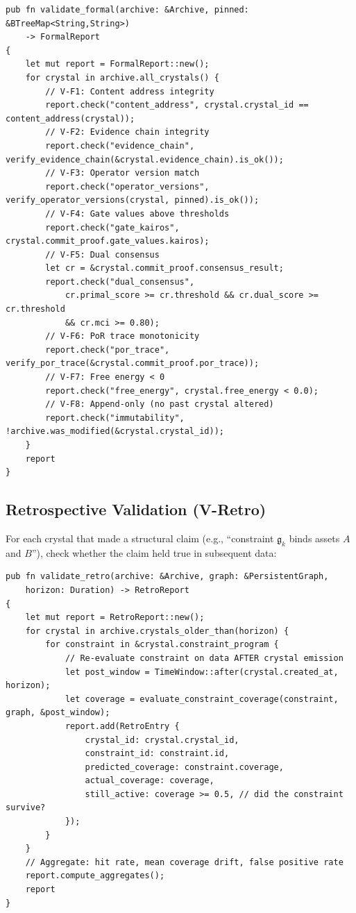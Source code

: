 \documentclass[10pt,a4paper]{article}
\begin{document}
\begin{lstlisting}[style=rust]
pub fn validate_formal(archive: &Archive, pinned: &BTreeMap<String,String>)
    -> FormalReport
{
    let mut report = FormalReport::new();
    for crystal in archive.all_crystals() {
        // V-F1: Content address integrity
        report.check("content_address", crystal.crystal_id == content_address(crystal));
        // V-F2: Evidence chain integrity
        report.check("evidence_chain", verify_evidence_chain(&crystal.evidence_chain).is_ok());
        // V-F3: Operator version match
        report.check("operator_versions", verify_operator_versions(crystal, pinned).is_ok());
        // V-F4: Gate values above thresholds
        report.check("gate_kairos", crystal.commit_proof.gate_values.kairos);
        // V-F5: Dual consensus
        let cr = &crystal.commit_proof.consensus_result;
        report.check("dual_consensus",
            cr.primal_score >= cr.threshold && cr.dual_score >= cr.threshold
            && cr.mci >= 0.80);
        // V-F6: PoR trace monotonicity
        report.check("por_trace", verify_por_trace(&crystal.commit_proof.por_trace));
        // V-F7: Free energy < 0
        report.check("free_energy", crystal.free_energy < 0.0);
        // V-F8: Append-only (no past crystal altered)
        report.check("immutability", !archive.was_modified(&crystal.crystal_id));
    }
    report
}
\end{lstlisting}

\subsection{Retrospective Validation (V-Retro)}

For each crystal that made a structural claim (e.g., ``constraint $\mathfrak{g}_k$ binds assets $A$ and $B$''), check whether the claim held true in subsequent data:

\begin{lstlisting}[style=rust]
pub fn validate_retro(archive: &Archive, graph: &PersistentGraph,
    horizon: Duration) -> RetroReport
{
    let mut report = RetroReport::new();
    for crystal in archive.crystals_older_than(horizon) {
        for constraint in &crystal.constraint_program {
            // Re-evaluate constraint on data AFTER crystal emission
            let post_window = TimeWindow::after(crystal.created_at, horizon);
            let coverage = evaluate_constraint_coverage(constraint, graph, &post_window);
            report.add(RetroEntry {
                crystal_id: crystal.crystal_id,
                constraint_id: constraint.id,
                predicted_coverage: constraint.coverage,
                actual_coverage: coverage,
                still_active: coverage >= 0.5, // did the constraint survive?
            });
        }
    }
    // Aggregate: hit rate, mean coverage drift, false positive rate
    report.compute_aggregates();
    report
}
\end{lstlisting}
\end{document}
